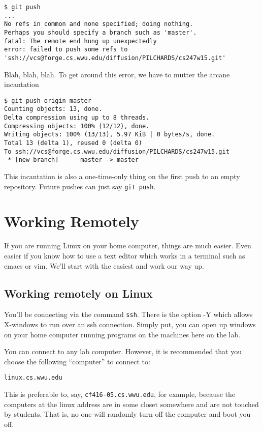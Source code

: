 \documentclass[12pt]{article}
\begin{document}
\begin{verbatim}
$ git push
...
No refs in common and none specified; doing nothing.
Perhaps you should specify a branch such as 'master'.
fatal: The remote end hung up unexpectedly
error: failed to push some refs to 'ssh://vcs@forge.cs.wwu.edu/diffusion/PILCHARDS/cs247w15.git'
\end{verbatim}

Blah, blah, blah.  To get around this error, we have to mutter the arcane incantation

\begin{verbatim}
$ git push origin master
Counting objects: 13, done.
Delta compression using up to 8 threads.
Compressing objects: 100% (12/12), done.
Writing objects: 100% (13/13), 5.97 KiB | 0 bytes/s, done.
Total 13 (delta 1), reused 0 (delta 0)
To ssh://vcs@forge.cs.wwu.edu/diffusion/PILCHARDS/cs247w15.git
 * [new branch]      master -> master
\end{verbatim}

This incantation is also a one-time-only thing on the first push to an empty repository.  Future pushes can just say \verb|git push|.

\section{Working Remotely}
If you are running Linux on your home computer, things are much easier. Even easier if you know how to use a text editor which works in a terminal such as emacs or vim. We'll start with the easiest and work our way up.

\subsection{Working remotely on Linux}
You'll be connecting via the command \verb|ssh|. There is the option -Y which allows X-windows to run over an ssh connection. Simply put, you can open up windows on your home computer running programs on the machines here on the lab.

You can connect to any lab computer. However, it is recommended that you choose the following ``computer'' to connect to:
\begin{verbatim}
linux.cs.wwu.edu
\end{verbatim}
This is preferable to, say, \verb|cf416-05.cs.wwu.edu|, for example, because the computers at the linux address are in some closet somewhere and are not touched by students. That is, no one will randomly turn off the computer and boot you off.
\end{document}
